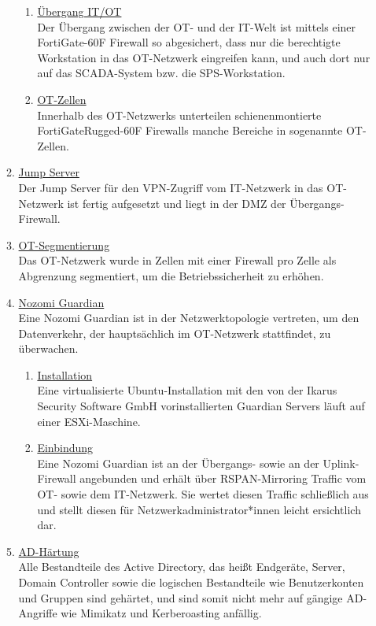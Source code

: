 \documentclass[
	headings=optiontotocandhead,%
	oneside,
	numbers=noenddot,%
	toc=flat, %
	10pt, %
	parskip=full, %
	listof=totoc, %
	listof=flat, %
	numbers=noenddot, %
	bibliography=totoc, %
	a4paper,DIV=14,
]{scrartcl}
\begin{document}
\begin{enumerate}[start=1,label={\bfseries Ziel-H \arabic*},leftmargin=*,wide]
\begin{enumerate}[label=\alph*.]
\begin{enumerate}[label=\roman*.]
\item{\underline{Übergang IT/OT}}\\
Der Übergang zwischen der OT- und der IT-Welt ist mittels einer FortiGate-60F Firewall so abgesichert, dass nur die berechtigte Workstation in das OT-Netzwerk eingreifen kann, und auch dort nur auf das SCADA-System bzw. die SPS-Workstation.

\item{\underline{OT-Zellen}}\\
Innerhalb des OT-Netzwerks unterteilen schienenmontierte FortiGateRugged-60F Firewalls manche Bereiche in sogenannte OT-Zellen.
\end{enumerate}

\item{\underline{Jump Server}}\\
Der Jump Server für den VPN-Zugriff vom IT-Netzwerk in das OT-Netzwerk ist fertig aufgesetzt und liegt in der DMZ der Übergangs-Firewall.

\item{\underline{OT-Segmentierung}}\\
Das OT-Netzwerk wurde in Zellen mit einer Firewall pro Zelle als Abgrenzung segmentiert, um die Betriebssicherheit zu erhöhen.

\item{\underline{Nozomi Guardian}}\\
Eine Nozomi Guardian ist in der Netzwerktopologie vertreten, um den Datenverkehr, der hauptsächlich im OT-Netzwerk stattfindet, zu überwachen.
\begin{enumerate}[label=\roman*.]
\item{\underline{Installation}}\\
Eine virtualisierte Ubuntu-Installation mit den von der Ikarus Security Software GmbH vorinstallierten Guardian Servers läuft auf einer ESXi-Maschine.

\item{\underline{Einbindung}}\\
Eine Nozomi Guardian ist an der Übergangs- sowie an der Uplink-Firewall angebunden und erhält über RSPAN-Mirroring Traffic vom OT- sowie dem IT-Netzwerk. Sie wertet diesen Traffic schließlich aus und stellt diesen für Netzwerkadministrator*innen leicht ersichtlich dar.
\end{enumerate}

\item{\underline{AD-Härtung}}\\
Alle Bestandteile des Active Directory, das heißt Endgeräte, Server, Domain Controller sowie die logischen Bestandteile wie Benutzerkonten und Gruppen sind gehärtet, und sind somit nicht mehr auf gängige AD-Angriffe wie Mimikatz und Kerberoasting anfällig.
\end{enumerate}


\end{enumerate}
\end{document}
